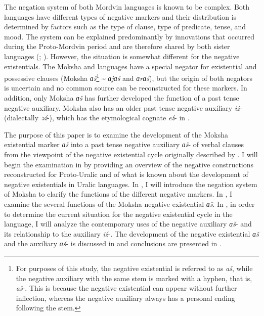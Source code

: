 \documentclass[output=paper,colorlinks,citecolor=brown,draft,draftmode]{langscibook}
\begin{document}
  The negation system of both Mordvin languages is known to be complex. Both languages have different types of negative markers and their distribution is determined by factors such as the type of clause, type of predicate, tense, and mood. The system can be explained predominantly by innovations that occurred during the Proto-Mordvin period and are therefore shared by both sister languages (\citealt[140--144]{Bartens1999}; \citealt{Hamari2007,Hamari2011,Hamari2013,HamariAasmae2015}). However, the situation is somewhat different for the negative existentials. The Moksha and  languages have a special negator for existential and possessive clauses (Moksha \textit{ɑš}\footnote{For purposes of this study, the negative existential is referred to as \textit{aš}, while the negative auxiliary with the same stem is marked with a hyphen, that is, \textit{aš}-. This is because the negative existential can appear without further inflection, whereas the negative auxiliary always has a personal ending following the stem.} \textasciitilde{} \textit{ɑjɑš} and  \textit{ɑrɑś}), but the origin of both negators is uncertain and no common source can be reconstructed for these markers. In addition, only Moksha \textit{ɑš} has further developed the function of a past tense negative auxiliary. Moksha also has an older past tense negative auxiliary \textit{iź}- (dialectally \textit{əź}-), which has the etymological cognate \textit{eź}- in .

  The purpose of this paper is to examine the development of the Moksha existential marker \textit{ɑš} into a past tense negative auxiliary \textit{ɑš}- of verbal clauses from the viewpoint of the negative existential cycle originally described by \citet{Croft1991}. I will begin the examination in  by providing an overview of the negative constructions reconstructed for Proto-Uralic and of what is known about the development of negative existentials in Uralic languages. In , I will introduce the negation system of Moksha to clarify the functions of the different negative markers. In , I examine the several functions of the Moksha negative existential \textit{ɑš}. In , in order to determine the current situation for the negative existential cycle in the language, I will analyze the contemporary uses of the negative auxiliary \textit{ɑš}- and its relationship to the auxiliary \textit{iź}-. The development of the negative existential \textit{ɑš} and the auxiliary \textit{ɑš}- is discussed in  and conclusions are presented in .
\end{document}
